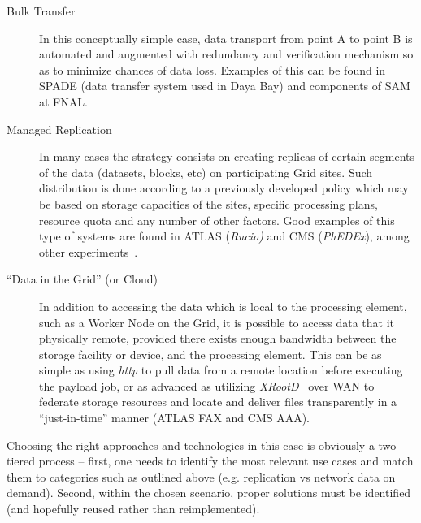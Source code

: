 \begin{description}
\item[Bulk Transfer] In this conceptually simple case, data transport from point A to point B is automated and augmented
with redundancy and verification mechanism so as to minimize chances of data loss. Examples of this can be found in SPADE
(data transfer system used in Daya Bay) and components of SAM at FNAL.

\item[Managed Replication] In many cases the strategy consists on creating replicas of certain segments of the data (datasets, blocks, etc)
on participating Grid sites. Such distribution is done according to a previously developed policy which may be based on storage capacities of 
the sites, specific processing plans, resource quota and any number of other factors. Good examples of this type of systems are found in
ATLAS (\textit{Rucio)} and CMS (\textit{PhEDEx}), among other experiments~\cite{rucio_chep13,phedex_chep09}.

\item[``Data in the Grid'' (or Cloud)] In addition to accessing the data which is local to the processing element, such as a Worker Node
on the Grid, it is possible to access data that it physically remote, provided there exists enough bandwidth between the storage
facility or device, and the processing element. This can be as simple as using \textit{http} to pull data from a remote location before
executing the payload job, or as advanced as utilizing \textit{XRootD}~\cite{xrootd,xrootd_web} over WAN to federate storage resources and locate and
deliver files transparently in a ``just-in-time'' manner (ATLAS FAX and CMS AAA).

\end{description}


 Choosing the right approaches and technologies in this case is obviously a two-tiered process -- first, one needs to identify the most
 relevant use cases and match them to categories such as outlined above (e.g. replication vs network data on demand). Second, within
 the chosen scenario, proper solutions must be identified (and hopefully reused rather than reimplemented).
   





